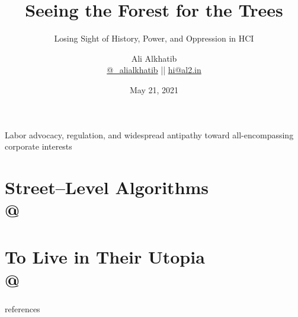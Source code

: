 \documentclass[aspectratio=169,12pt]{beamer} %
\title{Seeing the Forest for the Trees}
\subtitle{Losing Sight of History, Power, and Oppression in HCI}
\author[Ali Alkhatib]{{Ali Alkhatib}\\
\href{http://twitter.com/_alialkhatib}{@\_alialkhatib} || \href{mailto:hi@al2.in}{hi@al2.in}}
\date{May 21, 2021}
\newcommand{\onlyinsubfile}[1]{#1}
\newcommand{\notinsubfile}[1]{}
\begin{document}
\renewcommand{\onlyinsubfile}[1]{}
\renewcommand{\notinsubfile}[1]{#1}

\begin{frame}
\titlepage
\end{frame}


\def\stackalignment{l}
\def\stacktype{S}







\begin{frame}[standout]
  Labor advocacy, regulation, and widespread antipathy toward all-encompassing corporate interests

\end{frame}



\section{Street--Level Algorithms\\
{\hfill\footnotesize\citeauthor{streetLevelAlgorithms} @ }}















\section{To Live in Their Utopia\\
{\hfill\footnotesize\citeauthor{AlkhatibUtopia2021} @ }}
% 













% 


\begin{frame}[allowframebreaks]{references}
  \printbibliography{}
\end{frame}
\end{document}
